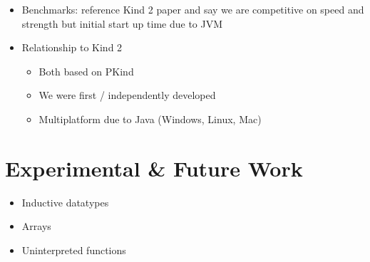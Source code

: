 \documentclass{article}
\begin{document}
\begin{itemize}
\item Benchmarks: reference Kind 2 paper and say we are competitive on
  speed and strength but initial start up time due to JVM
\item Relationship to Kind 2
  \begin{itemize}
  \item Both based on PKind
  \item We were first / independently developed
  \item Multiplatform due to Java (Windows, Linux, Mac)
  \end{itemize}
\end{itemize}

\section{Experimental \& Future Work}

\begin{itemize}
\item Inductive datatypes
\item Arrays
\item Uninterpreted functions
\end{itemize}
\end{document}
